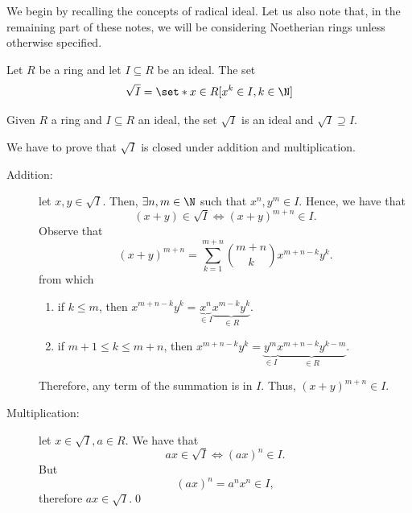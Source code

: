 \documentclass{subfiles}
\begin{document}
    We begin by recalling the concepts of radical ideal. Let us also note that, 
        in the remaining part of these notes, we will be considering Noetherian rings 
        unless otherwise specified.
    
    \begin{definition*}
        Let \(R\) be a ring and let \(I \subseteq R\) be an ideal.
            The set 
            \[
                \sqrt{I} = \set*{x \in R}[x^{k} \in I, k \in \N]
            \]
    \end{definition*}

    \begin{proposition*}
        Given \(R\) a ring and \(I \subseteq R\) an ideal, 
            the set \(\sqrt{I}\) is an ideal and \(\sqrt{I} \supseteq I\).
    \end{proposition*}

    \begin{proof*}
        We have to prove that \(\sqrt{I}\) is closed under addition and multiplication.
        \begin{description}
            \item [Addition:] let \(x, y \in \sqrt{I}\). Then, \(\exists n, m \in \N\)
                such that \(x^{n}, y^{m} \in I\). Hence, we have that 
                \[
                    (x + y) \in \sqrt{I} \iff (x + y)^{m + n} \in I.
                \]
                Observe that
                \[
                    (x + y)^{m + n} = \sum_{k = 1}^{m + n} \binom{m + n}{k} x^{m + n - k}y^{k}.
                \]
                from which 
                \begin{enumerate}
                    \item if \(k \le m\), then \(x^{m + n - k}y^{k} = 
                        \underbrace{x^{n}}_{\in I} \underbrace{x^{m - k} y^{k}}_{\in R}\).
                    \item if \(m + 1 \le k \le m + n\), then \(x^{m + n - k}y^{k} = 
                        \underbrace{y^{m}}_{\in I} \underbrace{x^{m + n - k}y^{k - m}}_{\in R}\).
                \end{enumerate}
            Therefore, any term of the summation is in \(I\). Thus, \((x + y)^{m + n} \in I\).

            \item [Multiplication:] let \(x \in \sqrt{I}, a \in R\). We have that 
                \[
                    ax \in \sqrt{I} \iff (ax)^{n} \in I. 
                \]
                But 
                \[
                    (ax)^n = a^{n}x^{n} \in I,
                \]
                therefore \(ax \in \sqrt{I}\).\qed
        \end{description}
    \end{proof*}
    \clearpage
\end{document}
